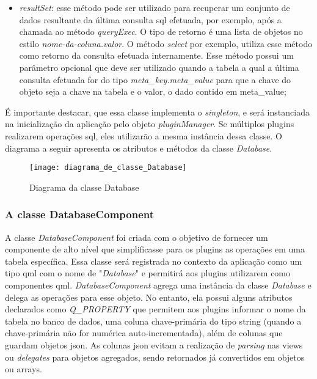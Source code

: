 \begin{itemize}
	\item \textit{resultSet}: esse método pode ser utilizado para recuperar um conjunto de dados resultante da última consulta sql efetuada, por exemplo, após a chamada ao método \textit{queryExec}. O tipo de retorno é uma lista de objetos no estilo \textit{nome-da-coluna.valor}. O método \textit{select} por exemplo, utiliza esse método como retorno da consulta efetuada internamente. Esse método possui um parâmetro opcional que deve ser utilizado quando a tabela a qual a última consulta efetuada for do tipo \textit{meta\_key.meta\_value} para que a chave do objeto seja a chave na tabela e o valor, o dado contido em meta\_value;
\end{itemize}

É importante destacar, que essa classe implementa o \textit{singleton}, e será instanciada na inicialização da aplicação pelo objeto \textit{pluginManager}. Se múltiplos plugins realizarem operações sql, eles utilizarão a mesma instância dessa classe. O diagrama a seguir apresenta os atributos e métodos da classe \textit{Database}.

\begin{figure}[h]
	\texttt{[image: diagrama\_de\_classe\_Database]}
	\centering
	\caption{Diagrama da classe Database}
\end{figure}

\subsubsection{A classe DatabaseComponent}\label{sec:solucao-desenvolvida}
A classe \textit{DatabaseComponent} foi criada com o objetivo de fornecer um componente de alto nível que simplificasse para os plugins as operações em uma tabela específica. Essa classe será registrada no contexto da aplicação como um tipo qml com o nome de "\textit{Database}" e permitirá aos plugins utilizarem como componentes qml. \textit{DatabaseComponent} agrega uma instância da classe \textit{Database} e delega as operações para esse objeto. No entanto, ela possui alguns atributos declarados como \textit{Q\_PROPERTY} que permitem aos plugins informar o nome da tabela no banco de dados, uma coluna chave-primária do tipo string (quando a chave-primária não for numérica auto-incrementada), além de colunas que guardam objetos json. As colunas json evitam a realização de \textit{parsing} nas views ou \textit{delegates} para objetos agregados, sendo retornados já convertidos em objetos ou arrays.\par

